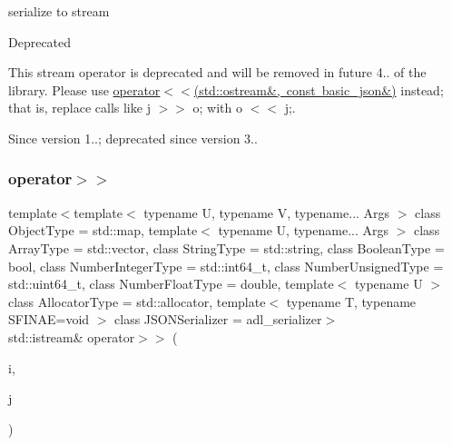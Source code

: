 serialize to stream 

\begin{DoxyRefDesc}{Deprecated}
\item[\mbox{\hyperlink{deprecated__deprecated000002}{Deprecated}}]This stream operator is deprecated and will be removed in future 4.. of the library. Please use \mbox{\hyperlink{classnlohmann_1_1basic__json_a5e34c5435e557d0bf666bd7311211405}{operator$<$$<$(std\+::ostream\&, const basic\+\_\+json\&)}} instead; that is, replace calls like {\ttfamily j $>$$>$ o;} with {\ttfamily o $<$$<$ j;}. \end{DoxyRefDesc}
\begin{DoxySince}{Since}
version 1..; deprecated since version 3.. 
\end{DoxySince}
\mbox{\label{classnlohmann_1_1basic__json_aaf363408931d76472ded14017e59c9e8}} 
\subsubsection{\texorpdfstring{operator$>$$>$}{operator>>}\hspace{0.1cm}{\footnotesize\ttfamily [2/2]}}
{\footnotesize\ttfamily template$<$template$<$ typename U, typename V, typename... Args $>$ class Object\+Type = std\+::map, template$<$ typename U, typename... Args $>$ class Array\+Type = std\+::vector, class String\+Type  = std\+::string, class Boolean\+Type  = bool, class Number\+Integer\+Type  = std\+::int64\+\_\+t, class Number\+Unsigned\+Type  = std\+::uint64\+\_\+t, class Number\+Float\+Type  = double, template$<$ typename U $>$ class Allocator\+Type = std\+::allocator, template$<$ typename T, typename S\+F\+I\+N\+A\+E=void $>$ class J\+S\+O\+N\+Serializer = adl\+\_\+serializer$>$ \\
std\+::istream\& operator$>$$>$ (\begin{DoxyParamCaption}\item[{std\+::istream \&}]{i,  }\item[{\mbox{\hyperlink{classnlohmann_1_1basic__json}{basic\+\_\+json}}$<$ Object\+Type, Array\+Type, String\+Type, Boolean\+Type, Number\+Integer\+Type, Number\+Unsigned\+Type, Number\+Float\+Type, Allocator\+Type, J\+S\+O\+N\+Serializer $>$ \&}]{j }\end{DoxyParamCaption})\hspace{0.3cm}{\ttfamily [friend]}}



